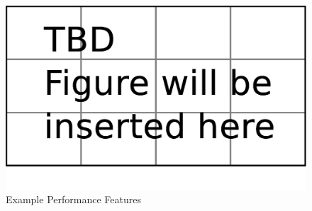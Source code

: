 \begin{figure}[tp]
   \begin{center}
      \includegraphics[width=\textwidth]{fig/TBDFigure}

   \end{center}
   \caption{Example Performance Features}
   \label{fig:expPerfFeat}
\end{figure}

